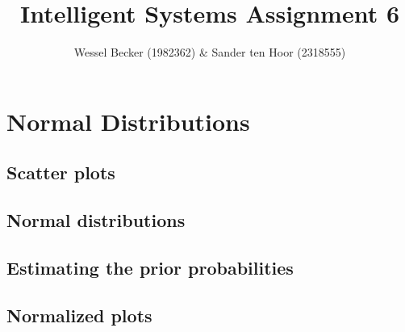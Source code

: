 \documentclass[10pt,a4paper]{article}
\begin{document}
\title{Intelligent Systems Assignment 6}
\author{Wessel Becker (1982362) \& Sander ten Hoor (2318555)}
\maketitle

\newcommand{\simplesubfigure}[3]{
  \noindent\begin{minipage}{.31\linewidth}
    \begin{center}
      \texttt{[image: \#1]}
      \captionof{figure}{#2}
      \label{#3}
    \end{center}
  \end{minipage}\hspace{7pt}
}
\newcommand{\simplefigure}[3]{
	\noindent\begin{figure}[H]
  	\centering
    	\makebox[.6\textwidth]
    	{
    		\texttt{[image: \#1]}
 		} \\
  		\caption{#2}
  		\label{#3}
	\end{figure}
}
\newcommand{\mcode}[2]{
	\label{#2}
}

\section{Normal Distributions}
\subsection{Scatter plots}
\subsection{Normal distributions}
\subsection{Estimating the prior probabilities}
\subsection{Normalized plots}
\end{document}
